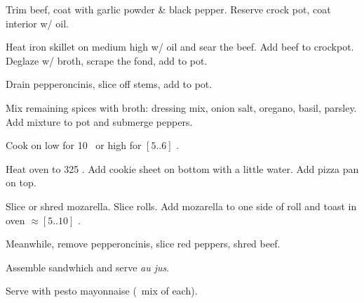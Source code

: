 \begin{preparation}
\item Trim beef, coat with garlic powder \& black pepper.
	Reserve crock pot, coat interior w/ oil.

\item Heat iron skillet on medium high w/ oil and sear the beef.
	Add beef to crockpot.
	Deglaze w/ broth, scrape the fond, add to pot.

\item Drain pepperoncinis, slice off stems, add to pot.

\item Mix remaining spices with broth: dressing mix, onion salt, oregano, basil, parsley.
	Add mixture to pot and submerge peppers.

\item Cook on low for 10 \hour~or high for $[5..6]$ \hour.

\item Heat oven to 325 \Fahrenheit.
	Add cookie sheet on bottom with a little water.
	Add pizza pan on top.

\item Slice or shred mozarella.
	Slice rolls.
	Add mozarella to one side of roll and toast in oven $\approx[5..10]$ \minute.

\item Meanwhile, remove pepperoncinis, slice red peppers, shred beef.

\item Assemble sandwhich and serve \textit{au jus}.
\end{preparation}


\begin{variation}
\item Serve with pesto mayonnaise (\onehalf~mix of each).
\end{variation}


\recipeend%
